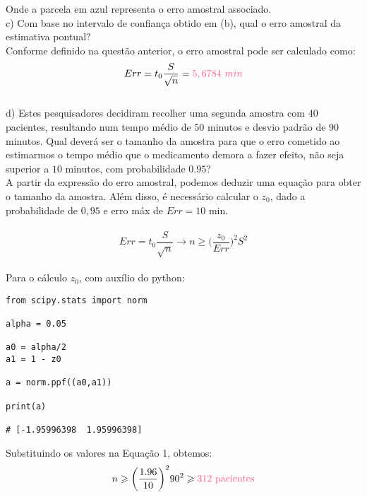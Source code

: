 Onde a parcela em \textcolor{deepblue}{azul} representa o erro amostral associado.\\

c) Com base no intervalo de confiança obtido em (b), qual o erro amostral da estimativa pontual?\\

Conforme definido na questão anterior, o erro amostral pode ser calculado como:\\

\[
    Err = t_0\frac{S}{\sqrt{n}} = \textcolor{COLOR2}{5,6784\ min}
\]
\\

d) Estes pesquisadores decidiram recolher uma segunda amostra com $40$ pacientes, resultando num tempo médio de $50$ minutos e desvio padrão de $90$ minutos. Qual deverá ser o tamanho da amostra para que o erro cometido ao estimarmos o tempo médio que o medicamento demora a fazer efeito, não seja superior a $10$ minutos, com probabilidade $0.95$?\\

A partir da expressão do erro amostral, podemos deduzir uma equação para obter o tamanho da amostra. Além disso, é necessário calcular o $z_0$, dado a probabilidade de $0,95$ e erro máx de $Err=10$ min.\\
\\

\begin{equation}
    Err = t_0\frac{S}{\sqrt{n}} \to n\geqslant \biggl(\frac{z_0}{Err}\biggr)^2 S^2
\end{equation}
\\

Para o cálculo $z_0$, com auxílio do python:\\

\begin{lstlisting}
from scipy.stats import norm
    
alpha = 0.05
            
a0 = alpha/2
a1 = 1 - z0
    
a = norm.ppf((a0,a1))
            
print(a)
    
# [-1.95996398  1.95996398]
\end{lstlisting}

Substituindo os valores na Equação 1, obtemos:\\

\[
    n\geqslant \biggl(\frac{1.96}{10}\biggr)^290^2 \geqslant \textcolor{COLOR2}{312\ \text{pacientes}}
\]
\\

